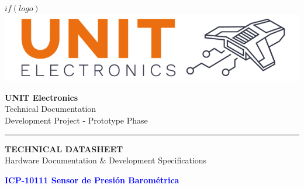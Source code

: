 \documentclass[11pt,a4paper]{article}
\begin{document}
\begin{titlepage}
    \centering
    
    \vspace*{0.5cm}
    
    \begin{minipage}{0.3\textwidth}
        \centering
        $if(logo)$
        \includegraphics[width=\textwidth]{logo.png}
        
    \end{minipage}
    \hfill
    \begin{minipage}{0.6\textwidth}
        \raggedleft
        {\small \textbf{UNIT Electronics}}\\
        {\footnotesize Technical Documentation}\\
        {\footnotesize Development Project - Prototype Phase}
    \end{minipage}
    
    \vspace{0.5cm}
    
    {\color{blue}\rule{\textwidth}{2pt}}
    
    \vspace{1.5cm}
    
    \begin{tcolorbox}[
        colback=blue!5!white,
        colframe=blue!75!black,
        width=0.9\textwidth,
        arc=2mm,
        boxrule=1.5pt,
        halign=center
    ]
    {\Large \textbf{TECHNICAL DATASHEET}}\\[0.2cm]
    {\normalsize Hardware Documentation \& Development Specifications}
    \end{tcolorbox}
    
    \vspace{0.8cm}
    
    {\Huge \textbf{\textcolor{blue}{ICP-10111 Sensor de Presión Barométrica}}}\\[0.3cm]
    
    

\end{titlepage}
\end{document}
